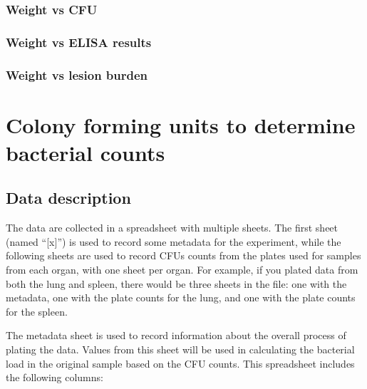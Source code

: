\documentclass[
]{book}
\begin{document}
\hypertarget{weight-vs-cfu}{%
\subsection{Weight vs CFU}\label{weight-vs-cfu}}

\hypertarget{weight-vs-elisa-results}{%
\subsection{Weight vs ELISA results}\label{weight-vs-elisa-results}}

\hypertarget{weight-vs-lesion-burden}{%
\subsection{Weight vs lesion burden}\label{weight-vs-lesion-burden}}

\hypertarget{colony-forming-units-to-determine-bacterial-counts}{%
\chapter{Colony forming units to determine bacterial counts}\label{colony-forming-units-to-determine-bacterial-counts}}

\hypertarget{data-description}{%
\section{Data description}\label{data-description}}

The data are collected in a spreadsheet with multiple sheets. The first sheet
(named ``{[}x{]}'') is used to record some metadata for the experiment, while the
following sheets are used to record CFUs counts from the plates used for samples
from each organ, with one sheet per organ. For example, if you plated data
from both the lung and spleen, there would be three sheets in the file: one
with the metadata, one with the plate counts for the lung, and one with the
plate counts for the spleen.

The metadata sheet is used to record information about the overall process of
plating the data. Values from this sheet will be used in calculating the bacterial
load in the original sample based on the CFU counts. This spreadsheet includes
the following columns:
\end{document}
